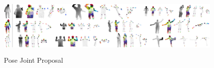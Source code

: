 \begin{figure}
	[h] \centering 
	\includegraphics[height=3cm]{figures/content/ni-pose.jpg} \caption{Pose Joint Proposal} \label{fg:ni:pose} 
\end{figure}
